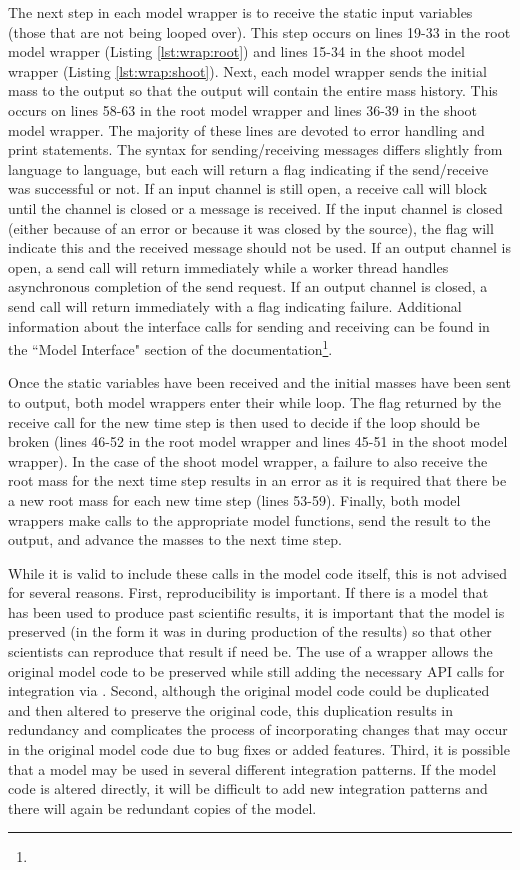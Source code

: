 \documentclass[journal]{IEEEtran}
\newcommand{\todo}[1]{{\color{red}{#1}}}
\newcommand{\pkg}{{\tt \todo{cis\_interface}}{}}
\begin{document}
The next step in each model wrapper is to receive the static input variables (those that are not being looped over). This step occurs on lines 19-33 in the root model wrapper (Listing \ref{lst:wrap:root}) and lines 15-34 in the shoot model wrapper (Listing \ref{lst:wrap:shoot}). Next, each model wrapper sends the initial mass to the output so that the output will contain the entire mass history. This occurs on lines 58-63 in the root model wrapper and lines 36-39 in the shoot model wrapper. The majority of these lines are devoted to error handling and print statements. The syntax for sending/receiving messages differs slightly from language to language, but each will return a flag indicating if the send/receive was successful or not. If an input channel is still open, a receive call will block until the channel is closed or a message is received. If the input channel is closed (either because of an error or because it was closed by the source), the flag will indicate this and the received message should not be used. If an output channel is open, a send call will return immediately while a worker thread handles asynchronous completion of the send request. If an output channel is closed, a send call will return immediately with a flag indicating failure. Additional information about the interface calls for sending and receiving can be found in the ``Model Interface" section of the documentation\footnote{{\tt \todo{link}}}.

Once the static variables have been received and the initial masses have been sent to output, both model wrappers enter their while loop. The flag returned by the receive call for the new time step is then used to decide if the loop should be broken (lines 46-52 in the root model wrapper and lines 45-51 in the shoot model wrapper). In the case of the shoot model wrapper, a failure to also receive the root mass for the next time step results in an error as it is required that there be a new root mass for each new time step (lines 53-59). Finally, both model wrappers make calls to the appropriate model functions, send the result to the output, and advance the masses to the next time step.

While it is valid to include these calls in the model code itself, this is not advised for several reasons. First, reproducibility is important. If there is a model that has been used to produce past scientific results, it is important that the model is preserved (in the form it was in during production of the results) so that other scientists can reproduce that result if need be. The use of a wrapper allows the original model code to be preserved while still adding the necessary API calls for integration via {\pkg}. Second, although the original model code could be duplicated and then altered to preserve the original code, this duplication results in redundancy and complicates the process of incorporating changes that may occur in the original model code due to bug fixes or added features. Third, it is possible that a model may be used in several different integration patterns. If the model code is altered directly, it will be difficult to add new integration patterns and there will again be redundant copies of the model.
\end{document}
